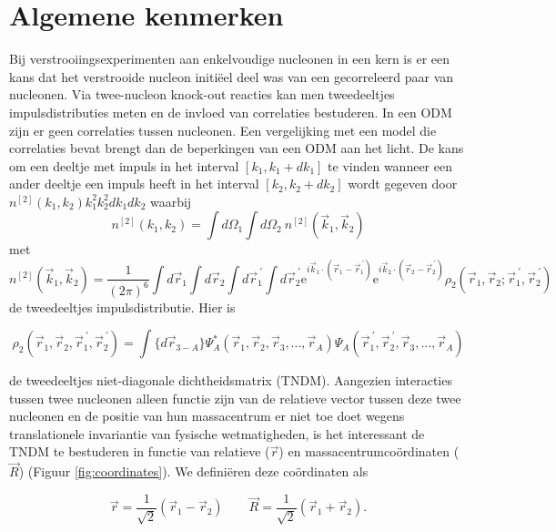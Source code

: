 \documentclass[11pt,twoside]{book}
\begin{document}
\section{Algemene kenmerken}
Bij verstrooiingsexperimenten aan enkelvoudige nucleonen in een kern is er een kans dat het verstrooide nucleon initi\"{e}el deel was van een gecorreleerd paar van nucleonen. Via twee-nucleon knock-out reacties kan men tweedeeltjes impulsdistributies meten \cite{niyazov2004two} en de invloed van correlaties bestuderen. In een ODM zijn er geen correlaties tussen nucleonen. Een vergelijking met een model die correlaties bevat brengt dan de beperkingen van een ODM aan het licht.
De kans om een deeltje met impuls in het interval $[k_1,k_1+dk_1]$ te vinden wanneer een ander deeltje een impuls heeft in het interval $[k_2,k_2+dk_2]$ wordt gegeven door $ n^{[2]}(k_1,k_2)k_1^2k_2^2dk_1dk_2$ waarbij
\begin{equation}
n^{[2]}(k_1,k_2) = \int d\Omega_1 \int d\Omega_2\  n^{[2]}(\vec{k}_1,\vec{k}_2)
\end{equation}
met 
\begin{equation}
n^{[2]}(\vec{k}_1,\vec{k}_2)=\frac{1}{(2\pi)^6}\int d\vec{r}_1 \int d\vec{r}_2 \int  
    						d\vec{r}_1^{\ \prime} \int d\vec{r}_2^{\ \prime} 
    						\mathrm{e}^{i\vec{k}_1\cdot (\vec{r}_1-\vec{r}^{\ \prime}_1)} 
    						\mathrm{e}^{i\vec{k}_2\cdot(\vec{r}_2-\vec{r}^{\ \prime}_2)}
    						\rho_2(\vec{r}_1,\vec{r}_2; \vec{r}_1^{\ \prime},\vec{r}_2^{\ \prime})
\end{equation}
de tweedeeltjes impulsdistributie. Hier is

\begin{equation}
\rho_2(\vec{r}_1,\vec{r}_2, \vec{r}_1^{\ \prime},\vec{r}_2^{\ \prime}) = \int \{d\vec{r}_{3-A}\} \Psi^*_A(\vec{r}_1,\vec{r}_2,\vec{r}_3, ... ,\vec{r}_A)\Psi_A(\vec{r}_1^{\ \prime},\vec{r}_2^{\ \prime},\vec{r}_3, ... ,\vec{r}_A)
\end{equation}

de tweedeeltjes niet-diagonale dichtheidsmatrix (TNDM). Aangezien interacties tussen twee  nucleonen alleen functie zijn van de relatieve vector tussen deze twee nucleonen en de positie van hun massacentrum er niet toe doet wegens translationele invariantie van fysische wetmatigheden, is het interessant de TNDM te bestuderen in functie van relatieve ($\vec{r}$) en massacentrumco\"{o}rdinaten ($\vec{R}$) (Figuur \ref{fig:coordinates}). We defini\"{e}ren deze co\"{o}rdinaten als


\begin{equation} \label{eq:rcm_def}
\vec{r}= \frac{1}{\sqrt{2}} \left(\vec{r}_1 - \vec{r}_2\right)  \qquad \vec{R}= \frac{1}{\sqrt{2}} \left(\vec{r}_1 + \vec{r}_2\right).
\end{equation}
\end{document}
